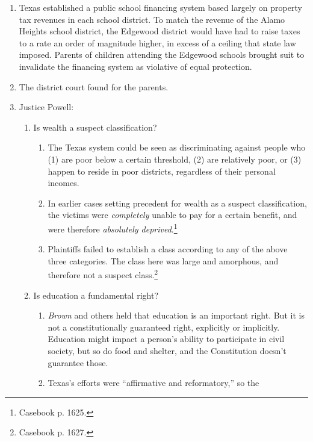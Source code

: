 \begin{enumerate}
    \item Texas established a public school financing system based largely on 
    property tax revenues in each school district. To match the revenue of the 
    Alamo Heights school district, the Edgewood district would have had to 
    raise taxes to a rate an order of magnitude higher, in excess of a ceiling 
    that state law imposed. Parents of children attending the Edgewood schools 
    brought suit to invalidate the financing system as violative of equal 
    protection.
    \item The district court found for the parents.
    \item Justice Powell:
    \begin{enumerate}
        \item Is wealth a suspect classification?
        \begin{enumerate}
            \item The Texas system could be seen as discriminating against 
            people who (1) are poor below a certain threshold, (2) are 
            relatively poor, or (3) happen to reside in poor districts, 
            regardless of their personal incomes.
            \item In earlier cases setting precedent for wealth as a suspect 
            classification, the victims were \emph{completely} unable to pay 
            for a certain benefit, and were therefore \emph{absolutely 
            deprived}.\footnote{Casebook p. 1625.}
            \item Plaintiffs failed to establish a class according to any of 
            the above three categories. The class here was large and 
            amorphous, and therefore not a suspect class.\footnote{Casebook p. 
            1627.}
        \end{enumerate}
        \item Is education a fundamental right?
        \begin{enumerate}
            \item \emph{Brown} and others held that education is an important 
            right. But it is not a constitutionally guaranteed right, 
            explicitly or implicitly. Education might impact a person's 
            ability to participate in civil society, but so do food and 
            shelter, and the Constitution doesn't guarantee those.
            \item Texas's efforts were ``affirmative and reformatory,'' so the 

\end{enumerate}
\end{enumerate}
\end{enumerate}

